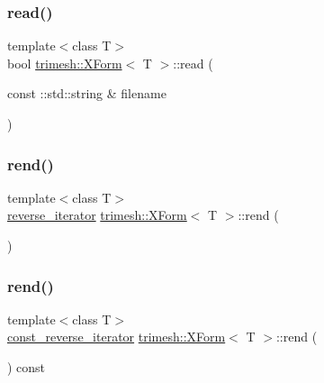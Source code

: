 \mbox{\label{classtrimesh_1_1XForm_a77252ad3a4017bb652723c1aa3c0629f}} 
\subsubsection{\texorpdfstring{read()}{read()}}
{\footnotesize\ttfamily template$<$class T$>$ \\
bool \hyperlink{classtrimesh_1_1XForm}{trimesh\+::\+X\+Form}$<$ T $>$\+::read (\begin{DoxyParamCaption}\item[{const \+::std\+::string \&}]{filename }\end{DoxyParamCaption})\hspace{0.3cm}{\ttfamily [inline]}}

\mbox{\label{classtrimesh_1_1XForm_aa8654437cbc439236d94346f20fe34f8}} 
\subsubsection{\texorpdfstring{rend()}{rend()}\hspace{0.1cm}{\footnotesize\ttfamily [1/2]}}
{\footnotesize\ttfamily template$<$class T$>$ \\
\hyperlink{classtrimesh_1_1XForm_a4729ea67a4ad434be421b066af3b672c}{reverse\+\_\+iterator} \hyperlink{classtrimesh_1_1XForm}{trimesh\+::\+X\+Form}$<$ T $>$\+::rend (\begin{DoxyParamCaption}{ }\end{DoxyParamCaption})\hspace{0.3cm}{\ttfamily [inline]}}

\mbox{\label{classtrimesh_1_1XForm_aec0170f12d76cc1462363060b6a3a35a}} 
\subsubsection{\texorpdfstring{rend()}{rend()}\hspace{0.1cm}{\footnotesize\ttfamily [2/2]}}
{\footnotesize\ttfamily template$<$class T$>$ \\
\hyperlink{classtrimesh_1_1XForm_a00d4231576ef7499e29885da090e807f}{const\+\_\+reverse\+\_\+iterator} \hyperlink{classtrimesh_1_1XForm}{trimesh\+::\+X\+Form}$<$ T $>$\+::rend (\begin{DoxyParamCaption}{ }\end{DoxyParamCaption}) const\hspace{0.3cm}{\ttfamily [inline]}}

